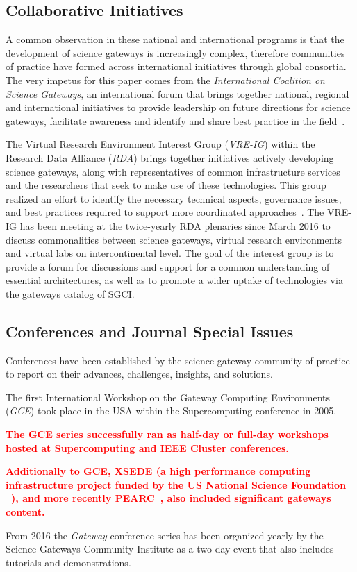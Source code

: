 \documentclass[review]{elsarticle}
\newcommand{\changedtext}[1]{
	\textcolor{red}{\textbf{#1}}
}
\begin{document}
\subsection{Collaborative Initiatives}

A common observation in these national and international programs is that the development of science gateways is increasingly complex, therefore communities of practice have formed across international initiatives through global consortia. The very impetus for this paper comes from the \emph{International Coalition on Science Gateways}, an international forum that brings together national, regional and international initiatives to provide leadership on future directions for science gateways, facilitate awareness and identify and share best practice in the field~\cite{icsg-23}. 

The Virtual Research Environment Interest Group (\emph{VRE-IG}) within the Research Data Alliance (\emph{RDA}) brings together initiatives actively developing science gateways, along with representatives of common infrastructure services and the researchers that seek to make use of these technologies. This group realized an effort to identify the necessary technical aspects, governance issues, and best practices required to support more coordinated approaches~\cite{rda-vre-ig-24}. 
The VRE-IG has been meeting at the twice-yearly RDA plenaries since March 2016 to discuss commonalities between science gateways, virtual research environments and virtual labs on intercontinental level. The goal of the interest group is to provide a forum for discussions and support for a common understanding of essential architectures, as well as to promote a wider uptake of technologies via the gateways catalog of SGCI.

\subsection{Conferences and Journal Special Issues}

Conferences have been established by the science gateway community of practice to report on their advances, challenges, insights, and solutions.

The first International Workshop on the Gateway Computing Environments (\emph{GCE}) took place in the USA within the Supercomputing conference in 2005. 
\changedtext{The GCE series successfully ran as half-day or full-day workshops hosted at Supercomputing and IEEE Cluster conferences. }
\changedtext{Additionally to GCE, XSEDE (a high performance computing infrastructure project funded by the US National Science Foundation ~\cite{xsede-website}), and more recently PEARC~\cite{pearc-website}, also included significant gateways content.} 
From 2016 the \emph{Gateway} conference series has been organized yearly by the Science Gateways Community Institute as a two-day event that also includes tutorials and demonstrations.
\end{document}
